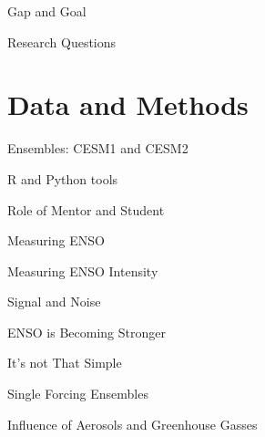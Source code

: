 \message{ !name(presentation.tex)}\documentclass{beamer}
\begin{document}
\begin{frame}{Gap and Goal}

\end{frame}

\begin{frame}{Research Questions}

\end{frame}

\section{Data and Methods}

\begin{frame}{Ensembles: CESM1 and CESM2}

\end{frame}

\begin{frame}{R and Python tools}

\end{frame}

\begin{frame}{Role of Mentor and Student}

\end{frame}

\begin{frame}{Measuring ENSO}

\end{frame}

\begin{frame}{Measuring ENSO Intensity}

\end{frame}

\begin{frame}{Signal and Noise}

\end{frame}

\begin{frame}{ENSO is Becoming Stronger}

\end{frame}

\begin{frame}{It's not That Simple}

\end{frame}

\begin{frame}{Single Forcing Ensembles}

\end{frame}

\begin{frame}{Influence of Aerosols and Greenhouse Gasses}

\end{frame}
\end{document}
